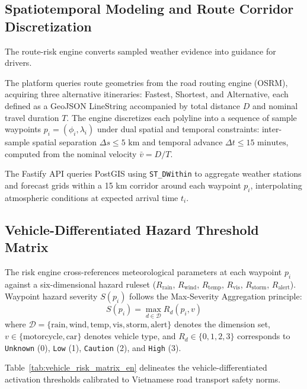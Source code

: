 \subsection{Spatiotemporal Modeling and Route Corridor Discretization}
The route-risk engine converts sampled weather evidence into guidance for drivers.

The platform queries route geometries from the road routing engine (OSRM), acquiring three alternative itineraries: Fastest, Shortest, and Alternative, each defined as a GeoJSON LineString accompanied by total distance $D$ and nominal travel duration $T$. The engine discretizes each polyline into a sequence of sample waypoints $p_i = (\phi_i, \lambda_i)$ under dual spatial and temporal constraints: inter-sample spatial separation $\Delta s \le 5\text{ km}$ and temporal advance $\Delta t \le 15\text{ minutes}$, computed from the nominal velocity $\bar{v} = D / T$.

The Fastify API queries PostGIS using \texttt{ST\_DWithin} to aggregate weather stations and forecast grids within a 15 km corridor around each waypoint $p_i$, interpolating atmospheric conditions at expected arrival time $t_i$.

\subsection{Vehicle-Differentiated Hazard Threshold Matrix}
The risk engine cross-references meteorological parameters at each waypoint $p_i$ against a six-dimensional hazard ruleset ($R_{\text{rain}}$, $R_{\text{wind}}$, $R_{\text{temp}}$, $R_{\text{vis}}$, $R_{\text{storm}}$, $R_{\text{alert}}$). Waypoint hazard severity $S(p_i)$ follows the Max-Severity Aggregation principle:
\begin{equation}
\label{eq:max_severity_aggregation_en}
S(p_i) = \max_{d \in \mathcal{D}} R_d(p_i, v)
\end{equation}
where $\mathcal{D} = \{\text{rain}, \text{wind}, \text{temp}, \text{vis}, \text{storm}, \text{alert}\}$ denotes the dimension set, $v \in \{\text{motorcycle}, \text{car}\}$ denotes vehicle type, and $R_d \in \{0, 1, 2, 3\}$ corresponds to \texttt{Unknown} (0), \texttt{Low} (1), \texttt{Caution} (2), and \texttt{High} (3).

Table~\ref{tab:vehicle_risk_matrix_en} delineates the vehicle-differentiated activation thresholds calibrated to Vietnamese road transport safety norms.

